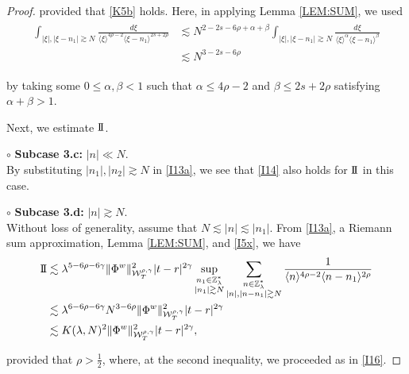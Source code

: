 \documentclass[letterpaper, 11pt,  reqno]{amsart}
\DeclareMathOperator*{\intt}{\int}
\newcommand{\1}{\hspace{0.5mm}\text{I}\hspace{0.5mm}}
\newcommand{\II}{\text{I \hspace{-2.8mm} I} }
\newcommand{\noi}{\noindent}
\newcommand{\Z}{\mathbb{Z}}
\newcommand{\al}{\alpha}
\newcommand{\be}{\beta}
\newcommand{\g}{\gamma}
\newcommand{\ld}{\lambda}
\newcommand{\les}{\lesssim}
\newcommand{\ges}{\gtrsim}
\newcommand{\jb}[1]
{\langle #1 \rangle}
\newcommand{\W}{\mathcal{W}}
\numberwithin{equation}{section}
\numberwithin{theorem}{section}
\begin{document}
\begin{proof}
\noi
provided that 
  \eqref{K5b} holds.
 Here, in applying Lemma \ref{LEM:SUM}, 
we used 
\begin{align}
\begin{split}
\intt_{|\xi|, |\xi - n_1|\ges N} 
\frac{d\xi}{\jb{\xi}^{4\rho - 2}
\jb{ \xi - n_1}^{2s + 2\rho}}
& \les N^{2- 2s - 6\rho + \al +\be}
\intt_{|\xi|, |\xi - n_1|\ges N} 
\frac{d\xi}{\jb{\xi}^{\al}
\jb{ \xi - n_1}^{\be}}
\\
& \les N^{3- 2s - 6\rho}
\end{split}
\label{I16}
\end{align}

\noi
by taking some $0 \le \al, \be < 1$
such that $\al \le 4\rho - 2$
and $ \be \le 2s + 2\rho$
satisfying $\al + \be > 1$.




\medskip

Next, we  estimate $\II$.


\noi
$\circ$ {\bf Subcase 3.c:}  $|n| \ll N$.\\
\indent
By substituting  $|n_1|, |n_2|\ges N$ in \eqref{I13a}, 
we see that \eqref{I14} also holds for $\II$ in this case.





\medskip

\noi
$\circ$ {\bf Subcase 3.d:}  $|n| \ges N$.\\
\indent
Without loss of generality, assume that $N \les |n| \les |n_1|$.
From \eqref{I13a}, 
 a Riemann sum approximation, 
Lemma \ref{LEM:SUM}, 
and 
\eqref{I5x}, 
we have
\begin{align*}
\II
&\les 
\ld^{5-6\rho -6\g}
\| \Phi^{w} \|^2_{\W_{T}^{\rho, \g}} 
|t-r|^{2\g} 
\sup_{\substack{n_1 \in \Z_\ld^*\\|n_1|\ges N} }
\sum_{\substack{n \in \Z_\ld^*\\|n|, |n- n_1|\ges N}} 
\frac{1}{\jb{n}^{4\rho - 2}\jb{n - n_1}^{2\rho}}\\
 &\les 
\ld^{6-6\rho -6\g}N^{3-6\rho }
 \| \Phi^{w} \|^2_{\W_{T}^{\rho, \g}}  
|t-r|^{2\g}\\
 &\les 
K(\ld, N)^2
 \| \Phi^{w} \|^2_{\W_{T}^{\rho, \g}}  
|t-r|^{2\g}, 
\end{align*}

\noi
provided that $\rho > \frac 12$, 
where, at the second inequality, we proceeded as in \eqref{I16}.
\end{proof}
\end{document}
